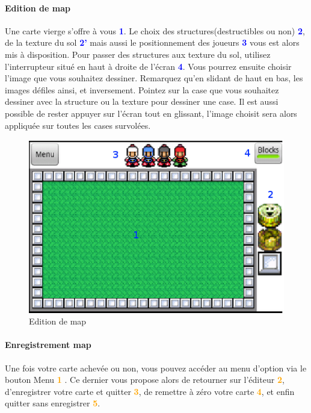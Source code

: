	
	\paragraph{Edition de map\\}
	Une carte vierge s'offre à vous \textcolor{blue}{\textbf{1}}. Le choix des
	structures(destructibles ou non) \textcolor{blue}{\textbf{2}}, de la texture du
	sol \textcolor{blue}{\textbf{2'}} mais aussi le positionnement des joueurs
	\textcolor{blue}{\textbf{3}} vous est alors mis à disposition. Pour passer des
	structures aux texture du sol, utilisez l'interrupteur situé en haut à droite
	de l'écran \textcolor{blue}{\textbf{4}}. Vous pourrez ensuite choisir l'image
	que vous souhaitez dessiner. Remarquez qu'en slidant de haut en bas, les images défiles ainsi, et inversement. Pointez
	sur la case que vous souhaitez dessiner avec la structure ou la texture pour
	dessiner une case. Il est aussi possible de rester appuyer sur l'écran tout en
	glissant, l'image choisit sera alors appliquée sur toutes les cases survolées.
	
	
	\begin{figure}[h]
	\centering
		\includegraphics[scale=0.7]{Manuel/Img/11.eps}
		\caption{Edition de map}
	\end{figure}
	
	\paragraph{Enregistrement map\\}
	Une fois votre carte achevée ou non, vous pouvez accéder au menu d'option
	via le bouton Menu \textcolor{orange}{\textbf{1}} . Ce dernier vous propose
	alors de retourner sur l'éditeur \textcolor{orange}{\textbf{2}}, d'enregistrer votre
	carte et quitter \textcolor{orange}{\textbf{3}}, de remettre à zéro votre carte
	\textcolor{orange}{\textbf{4}}, et enfin quitter sans enregistrer
	\textcolor{orange}{\textbf{5}}. 
	
